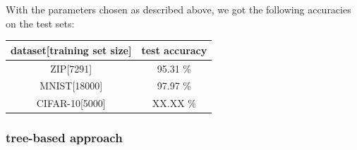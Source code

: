 With the parameters chosen as described above, we got the following accuracies on the test sets:\\

\begin{tabular}{c|c}
 dataset[training set size] & test accuracy \\ \hline
 ZIP[7291] & 95.31 \% \\
 MNIST[18000] & 97.97 \% \\
 CIFAR-10[5000] & XX.XX \% \\
\end{tabular}


\subsubsection{tree-based approach}